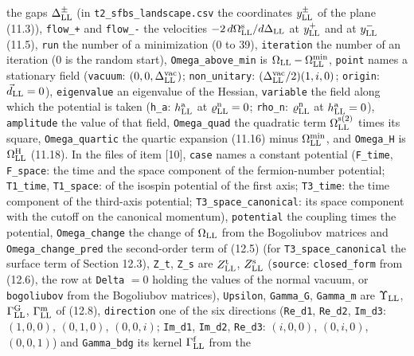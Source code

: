 \documentclass[
  10pt,
]{article}
\begin{document}
the gaps \(\Delta^\pm_{\rm LL}\) (in \texttt{t2\_sfbs\_landscape.csv}
the coordinates \(y^\pm_{\rm LL}\) of the plane (11.3)),
\texttt{flow\_+} and \texttt{flow\_-} the velocities
\(-2\,d\Omega^{\rm s}_{\rm LL}/d\Delta_{\rm LL}\) at \(y^+_{\rm LL}\)
and at \(y^-_{\rm LL}\) (11.5), \texttt{run} the number of a
minimization (0 to 39), \texttt{iteration} the number of an iteration (0
is the random start), \texttt{Omega\_above\_min} is
\(\Omega_{\rm LL}-\Omega^{\rm min}_{\rm LL}\), \texttt{point} names a
stationary field (\texttt{vacuum}: \((0,0,\Delta^{\rm vac}_{\rm LL})\);
\texttt{non\_unitary}: \((\Delta^{\rm vac}_{\rm LL}/2)(1,i,0)\);
\texttt{origin}: \(\vec d_{\rm LL}=0\)), \texttt{eigenvalue} an
eigenvalue of the Hessian, \texttt{variable} the field along which the
potential is taken (\texttt{h\_a}: \(h^{\rm a}_{\rm LL}\) at
\(\varrho^{\rm n}_{\rm LL}=0\); \texttt{rho\_n}:
\(\varrho^{\rm n}_{\rm LL}\) at \(h^{\rm a}_{\rm LL}=0\)),
\texttt{amplitude} the value of that field, \texttt{Omega\_quad} the
quadratic term \(\Omega^{\rm s(2)}_{\rm LL}\) times its square,
\texttt{Omega\_quartic} the quartic expansion (11.16) minus
\(\Omega^{\rm min}_{\rm LL}\), and \texttt{Omega\_H} is
\(\Omega^{\rm H}_{\rm LL}\) (11.18). In the files of item {[}10{]},
\texttt{case} names a constant potential (\texttt{F\_time},
\texttt{F\_space}: the time and the space component of the
fermion-number potential; \texttt{T1\_time}, \texttt{T1\_space}: of the
isospin potential of the first axis; \texttt{T3\_time}: the time
component of the third-axis potential; \texttt{T3\_space\_canonical}:
its space component with the cutoff on the canonical momentum),
\texttt{potential} the coupling times the potential,
\texttt{Omega\_change} the change of \(\Omega_{\rm LL}\) from the
Bogoliubov matrices and \texttt{Omega\_change\_pred} the second-order
term of (12.5) (for \texttt{T3\_space\_canonical} the surface term of
Section 12.3), \texttt{Z\_t}, \texttt{Z\_s} are \(Z^{\rm t}_{\rm LL}\),
\(Z^{\rm s}_{\rm LL}\) (\texttt{source}: \texttt{closed\_form} from
(12.6), the row at \texttt{Delta} \(=0\) holding the values of the
normal vacuum, or \texttt{bogoliubov} from the Bogoliubov matrices),
\texttt{Upsilon}, \texttt{Gamma\_G}, \texttt{Gamma\_m} are
\(\Upsilon_{\rm LL}\), \(\Gamma^{\rm G}_{\rm LL}\),
\(\Gamma^{\rm m}_{\rm LL}\) of (12.8), \texttt{direction} one of the six
directions (\texttt{Re\_d1}, \texttt{Re\_d2}, \texttt{Im\_d3}:
\((1,0,0)\), \((0,1,0)\), \((0,0,i)\); \texttt{Im\_d1}, \texttt{Im\_d2},
\texttt{Re\_d3}: \((i,0,0)\), \((0,i,0)\), \((0,0,1)\)) and
\texttt{Gamma\_bdg} its kernel \(\Gamma^{\rm f}_{\rm LL}\) from the
\end{document}
